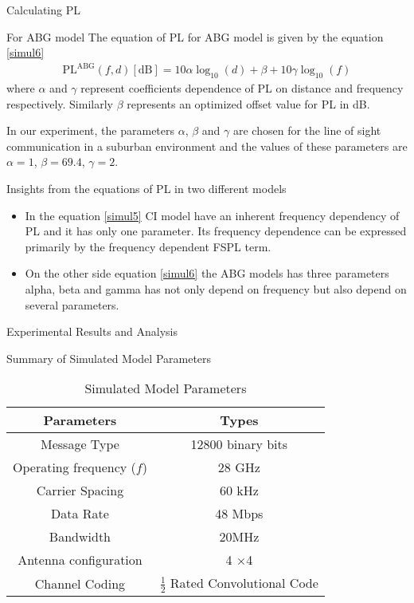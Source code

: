 \documentclass{beamer}
\begin{document}
\begin{frame}{Calculating PL}
  \begin{block}{For ABG model}
    The equation of PL for ABG model is given by the equation \eqref{simul6}
    \begin{align}
        \text{PL}^{\text{ABG}}(f,d)[\text{dB}] = 10\alpha\log_{10}(d) + \beta + 10\gamma\log_{10}(f) \label{simul6}
    \end{align}
    where $\alpha$ and $\gamma$ represent coefficients dependence of PL on distance and frequency respectively. Similarly $\beta$ represents an optimized offset value for PL in dB.
  \end{block}
  
  In our experiment, the parameters $\alpha$, $\beta$ and $\gamma$ are chosen for the line of sight communication in a suburban environment and the values of these parameters are $\alpha=1$, $\beta=69.4$, $\gamma=2$.
\end{frame}

\begin{frame}{Insights from the equations of PL in two different models}
\begin{itemize}
    \item In the equation \eqref{simul5} CI model have an inherent frequency dependency of PL and it has only one parameter. Its
    frequency dependence can be expressed primarily by the frequency dependent FSPL term.
    \item On the other side equation \eqref{simul6} the ABG models has three parameters alpha, beta and gamma has not only depend on frequency but also depend on several parameters.
\end{itemize}
\end{frame}

\begin{frame}{Experimental Results and Analysis}
\begin{block}{Summary of Simulated Model Parameters}
  \begin{table}[]
        \centering
\renewcommand{\arraystretch}{1.4}
        \caption{Simulated Model Parameters}
        \begin{tabular}{|c|c|}
        \hline
            Parameters     & Types \\ \hline
            Message Type   & 12800 binary bits\\ \hline
            Operating frequency ($f$) &28 GHz \\ \hline
            Carrier Spacing& 60 kHz\\ \hline
            Data Rate & 48 Mbps \\ \hline
            Bandwidth & 20MHz \\ \hline
            Antenna configuration & 4 $\times$4 \\ \hline
            Channel Coding&$\frac{1}{2}$ Rated Convolutional Code \\ \hline
        \end{tabular}
   \end{table}
\end{block}
\end{frame}
\end{document}
